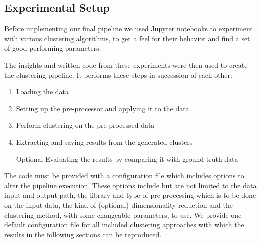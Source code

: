 \subsection{Experimental Setup}
Before implementing our final pipeline we used Jupyter notebooks to experiment with various clustering algorithms, to get a feel for their behavior and find a set of good performing parameters.

The insights and written code from these experiments were then used to create the clustering pipeline. It performs these steps in succession of each other:
\begin{enumerate}
    \item Loading the data
    \item Setting up the pre-processor and applying it to the data
    \item Perform clustering on the pre-processed data
    \item Extracting and saving results from the generated clusters
    \item [Optional] Evaluating the results by comparing it with ground-truth data
\end{enumerate}

The code must be provided with a configuration file which includes options to alter the pipeline execution. These options include but are not limited to the data input and output path, the library and type of pre-processing which is to be done on the input data, the kind of (optional) dimensionality reduction and the clustering method, with some changeable parameters, to use.
We provide one default configuration file for all included clustering approaches with which the results in the following sections can be reproduced. 